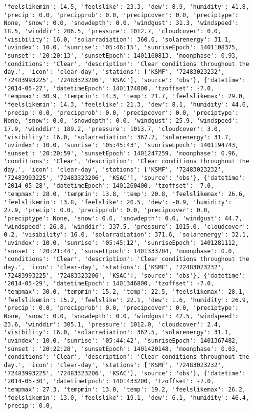 \documentclass[
  letterpaper,
  DIV=11,
  numbers=noendperiod]{scrartcl}
\begin{document}
\begin{verbatim}
'feelslikemin': 14.5, 'feelslike': 23.3, 'dew': 8.9, 'humidity': 41.8, 'precip': 0.0, 'precipprob': 0.0, 'precipcover': 0.0, 'preciptype': None, 'snow': 0.0, 'snowdepth': 0.0, 'windgust': 31.3, 'windspeed': 18.5, 'winddir': 206.5, 'pressure': 1012.7, 'cloudcover': 0.0, 'visibility': 16.0, 'solarradiation': 360.0, 'solarenergy': 31.1, 'uvindex': 10.0, 'sunrise': '05:46:15', 'sunriseEpoch': 1401108375, 'sunset': '20:20:13', 'sunsetEpoch': 1401160813, 'moonphase': 0.93, 'conditions': 'Clear', 'description': 'Clear conditions throughout the day.', 'icon': 'clear-day', 'stations': ['KSMF', '72483023232', '72483993225', '72483323206', 'KSAC'], 'source': 'obs'}, {'datetime': '2014-05-27', 'datetimeEpoch': 1401174000, 'tzoffset': -7.0, 'tempmax': 30.9, 'tempmin': 14.3, 'temp': 21.7, 'feelslikemax': 29.0, 'feelslikemin': 14.3, 'feelslike': 21.3, 'dew': 8.1, 'humidity': 44.6, 'precip': 0.0, 'precipprob': 0.0, 'precipcover': 0.0, 'preciptype': None, 'snow': 0.0, 'snowdepth': 0.0, 'windgust': 25.9, 'windspeed': 17.9, 'winddir': 189.2, 'pressure': 1013.7, 'cloudcover': 3.0, 'visibility': 16.0, 'solarradiation': 367.7, 'solarenergy': 31.7, 'uvindex': 10.0, 'sunrise': '05:45:43', 'sunriseEpoch': 1401194743, 'sunset': '20:20:59', 'sunsetEpoch': 1401247259, 'moonphase': 0.96, 'conditions': 'Clear', 'description': 'Clear conditions throughout the day.', 'icon': 'clear-day', 'stations': ['KSMF', '72483023232', '72483993225', '72483323206', 'KSAC'], 'source': 'obs'}, {'datetime': '2014-05-28', 'datetimeEpoch': 1401260400, 'tzoffset': -7.0, 'tempmax': 28.0, 'tempmin': 13.8, 'temp': 20.8, 'feelslikemax': 26.6, 'feelslikemin': 13.8, 'feelslike': 20.5, 'dew': -0.9, 'humidity': 27.9, 'precip': 0.0, 'precipprob': 0.0, 'precipcover': 0.0, 'preciptype': None, 'snow': 0.0, 'snowdepth': 0.0, 'windgust': 44.7, 'windspeed': 26.8, 'winddir': 337.5, 'pressure': 1015.0, 'cloudcover': 0.2, 'visibility': 16.0, 'solarradiation': 371.6, 'solarenergy': 32.1, 'uvindex': 10.0, 'sunrise': '05:45:12', 'sunriseEpoch': 1401281112, 'sunset': '20:21:44', 'sunsetEpoch': 1401333704, 'moonphase': 0.0, 'conditions': 'Clear', 'description': 'Clear conditions throughout the day.', 'icon': 'clear-day', 'stations': ['KSMF', '72483023232', '72483993225', '72483323206', 'KSAC'], 'source': 'obs'}, {'datetime': '2014-05-29', 'datetimeEpoch': 1401346800, 'tzoffset': -7.0, 'tempmax': 30.0, 'tempmin': 15.2, 'temp': 22.5, 'feelslikemax': 28.1, 'feelslikemin': 15.2, 'feelslike': 22.1, 'dew': 1.6, 'humidity': 26.9, 'precip': 0.0, 'precipprob': 0.0, 'precipcover': 0.0, 'preciptype': None, 'snow': 0.0, 'snowdepth': 0.0, 'windgust': 42.5, 'windspeed': 23.6, 'winddir': 305.1, 'pressure': 1012.0, 'cloudcover': 2.4, 'visibility': 16.0, 'solarradiation': 362.5, 'solarenergy': 31.1, 'uvindex': 10.0, 'sunrise': '05:44:42', 'sunriseEpoch': 1401367482, 'sunset': '20:22:28', 'sunsetEpoch': 1401420148, 'moonphase': 0.03, 'conditions': 'Clear', 'description': 'Clear conditions throughout the day.', 'icon': 'clear-day', 'stations': ['KSMF', '72483023232', '72483993225', '72483323206', 'KSAC'], 'source': 'obs'}, {'datetime': '2014-05-30', 'datetimeEpoch': 1401433200, 'tzoffset': -7.0, 'tempmax': 27.3, 'tempmin': 13.0, 'temp': 19.2, 'feelslikemax': 26.2, 'feelslikemin': 13.0, 'feelslike': 19.1, 'dew': 6.1, 'humidity': 46.4, 'precip': 0.0, 
\end{verbatim}
\end{document}
